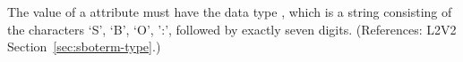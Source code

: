 The value of a  attribute must have the data type
, which is a string consisting of the characters `S', `B',
`O', ':', followed by exactly seven digits.  (References: L2V2
Section~\ref{sec:sboterm-type}.)
